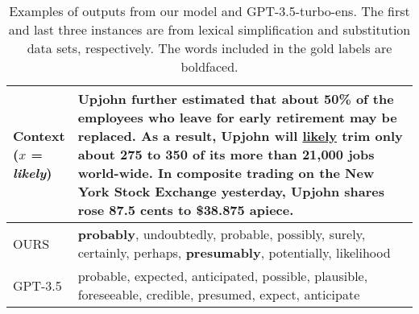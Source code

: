 \documentclass[11pt]{article}
\newcommand{\ex}[1]{\textit{#1}\xspace}
\begin{document}
\begin{table*}[t!]
\begin{center}
\begin{adjustbox}{max width=\textwidth}
\begin{tabular}{m{0.15\linewidth}m{0.9\linewidth}}
\makecell[l]{Context \\($x$ = \ex{likely})} & Upjohn further estimated that about 50\% of the employees who leave for early retirement may be replaced. As a result, Upjohn will \underline{likely} trim only about 275 to 350 of its more than 21,000 jobs world-wide. In composite trading on the New York Stock Exchange yesterday, Upjohn shares rose 87.5 cents to \$38.875 apiece.
\\\midrule
OURS &\textbf{probably}, undoubtedly, probable, possibly, surely, certainly, perhaps, \textbf{presumably}, potentially, likelihood
\\\midrule
GPT-3.5 &probable, expected, anticipated, possible, plausible, foreseeable, credible, presumed, expect, anticipate
\\

\bottomrule
\end{tabular}
\end{adjustbox}
\end{center}
\caption{Examples of outputs from our model and GPT-3.5-turbo-ens. The first and last three instances are from lexical simplification and substitution data sets, respectively. The words included in the gold labels are boldfaced.}\label{error_analysis_example}
\end{table*}
\end{document}
